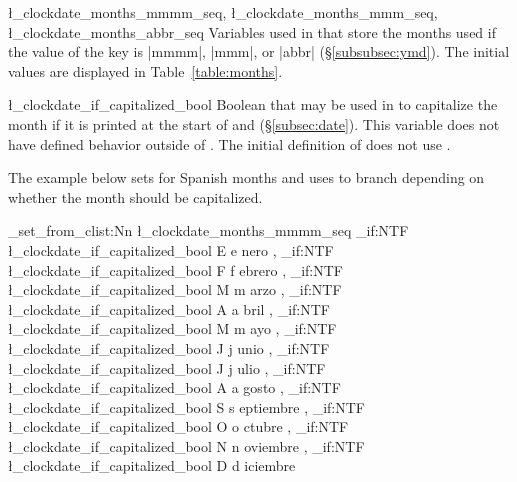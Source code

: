 \documentclass{beerydoc}
\begin{document}
\begin{codedoc}
  {
    \l_clockdate_months_mmmm_seq,
    \l_clockdate_months_mmm_seq,
    \l_clockdate_months_abbr_seq
  }
  Variables used in  that store the months used if
  the value of the key  is |mmmm|, |mmm|, or |abbr|
  (\S\ref{subsubsec:ymd}).
  The initial values are displayed in Table~\ref{table:months}.
\end{codedoc}



\begin{codedoc}{\l_clockdate_if_capitalized_bool}
  Boolean that may be used in  to capitalize the
  month if it is printed at the start of  and
   (\S\ref{subsec:date}).
  This variable does not have defined behavior outside of
  .
  The initial definition of  does not use
  .
\end{codedoc}

\clearpage
The example below sets  for Spanish months and
uses  to branch depending on whether the
month should be capitalized.
\begin{codedemo}
  \ExplSyntaxOn
  \seq_set_from_clist:Nn \l_clockdate_months_mmmm_seq
    {
        \bool_if:NTF \l_clockdate_if_capitalized_bool { E } { e } nero
      , \bool_if:NTF \l_clockdate_if_capitalized_bool { F } { f } ebrero
      , \bool_if:NTF \l_clockdate_if_capitalized_bool { M } { m } arzo
      , \bool_if:NTF \l_clockdate_if_capitalized_bool { A } { a } bril
      , \bool_if:NTF \l_clockdate_if_capitalized_bool { M } { m } ayo
      , \bool_if:NTF \l_clockdate_if_capitalized_bool { J } { j } unio
      , \bool_if:NTF \l_clockdate_if_capitalized_bool { J } { j } ulio
      , \bool_if:NTF \l_clockdate_if_capitalized_bool { A } { a } gosto
      , \bool_if:NTF \l_clockdate_if_capitalized_bool { S } { s } eptiembre
      , \bool_if:NTF \l_clockdate_if_capitalized_bool { O } { o } ctubre
      , \bool_if:NTF \l_clockdate_if_capitalized_bool { N } { n } oviembre
      , \bool_if:NTF \l_clockdate_if_capitalized_bool { D } { d } iciembre
    }
  \ExplSyntaxOff
  \\
  \\
  \\
  \\
  \\
  \\
  \\
  \\
  \\
  \\
  \\
\end{codedemo}
\end{document}
